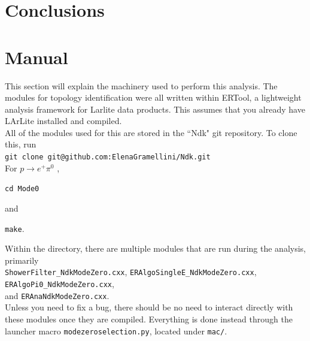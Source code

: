 \documentclass[a4paper, 10pt]{article}
\begin{document}

\section{Conclusions}


\nocite{*}




\appendix

\section{Manual}

This section will explain the machinery used to perform this analysis. The modules for topology identification were all written within ERTool, a lightweight analysis framework for Larlite data products. This assumes that you already have LArLite installed and compiled.\\

All of the modules used for this are stored in the ``Ndk" git repository. To clone this, run\\

\texttt{git clone git@github.com:ElenaGramellini/Ndk.git} \\

\noindent
For $p \rightarrow e^{+} \pi^{0}$ , 

\texttt{cd Mode0}

\noindent
and

\texttt{make}.

Within the directory, there are multiple modules that are run during the analysis, primarily\\
 \texttt{ShowerFilter\_NdkModeZero.cxx}, \texttt{ERAlgoSingleE\_NdkModeZero.cxx}, \texttt{ERAlgoPi0\_NdkModeZero.cxx}, \\ and \texttt{ERAnaNdkModeZero.cxx}. \\
Unless you need to fix a bug, there should be no need to interact directly with these modules once they are compiled. Everything is done instead through the launcher macro \texttt{modezeroselection.py}, located under \texttt{mac/}.
\end{document}
